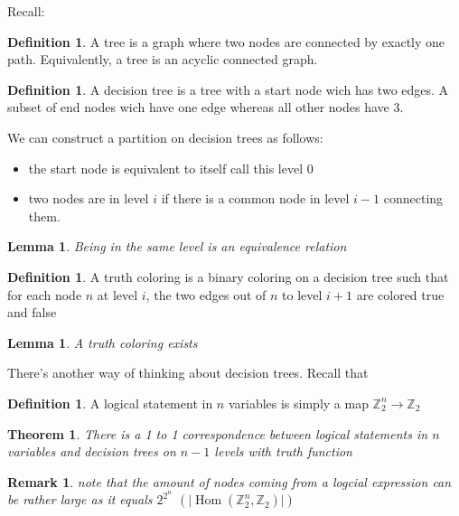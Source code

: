 \documentclass{book}
\theoremstyle{plain}
\newtheorem{theorem}[corollary]{Theorem}
\newtheorem{lemma}[corollary]{Lemma}
\newtheorem{remark}[corollary]{Remark}
\theoremstyle{definition}
\newtheorem{definition}[corollary]{Definition}
\DeclareMathOperator{\Hom}{Hom}
\newcommand{\mor}{\longrightarrow}
\newcommand{\Z}{\mathbb{Z}}
\begin{document}
Recall:

\begin{definition}
A  tree	is a graph where two nodes are connected by exactly one path. Equivalently, a tree is an acyclic connected graph.\\
\end{definition}

\begin{definition}
A decision tree is a tree with a start node wich has two edges. A subset of end nodes wich have one edge whereas all other nodes have 3.	
\end{definition}

We can construct a partition on decision trees as follows:

\begin{itemize}
\item the start node is equivalent to itself call this level $0$
\item 	two nodes are in level $i$ if there is a common node in level $i-1$ connecting them.
\end{itemize}

\begin{lemma}
Being in the same level is an equivalence relation	
\end{lemma}


\begin{definition}
A truth coloring is a binary coloring on a decision tree such that for each node $n$ at level $i$, the two edges out of $n$ to level $i+1$ are colored true and false
\end{definition}
\begin{lemma}
A truth coloring exists	
\end{lemma}

There's another way of thinking about decision trees. Recall that

\begin{definition}
A logical statement in $n$ variables is simply a map $\Z_2^n\mor \Z_2$	
\end{definition}

\begin{theorem}
There is a 1 to 1 correspondence between logical statements in $n$ variables and decision trees on $n-1$ levels with truth function 
\end{theorem}

\begin{remark}
note that the amount of nodes coming from a logcial expression can be rather large as it equals  ${2}^{2^n}$	$(\vert \Hom (\Z_2^n,\Z_2)\vert)$	
\end{remark}
\end{document}
